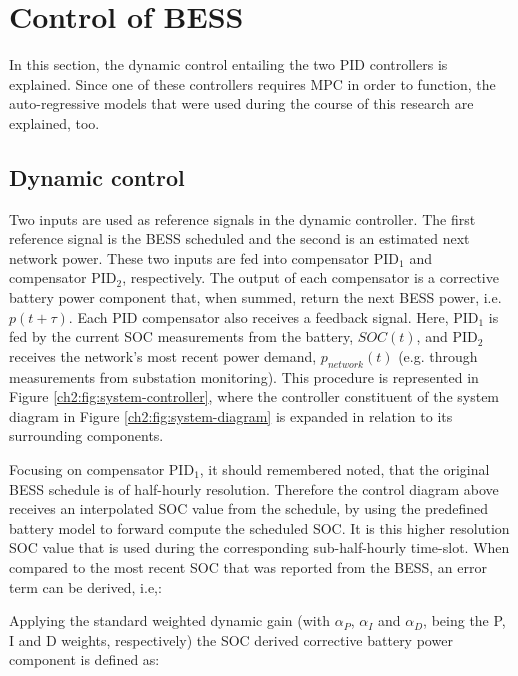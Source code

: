 \section{Control of BESS}
\label{ch2:sec:control-of-bess}

In this section, the dynamic control entailing the two PID controllers is explained.
Since one of these controllers requires MPC in order to function, the auto-regressive models that were used during the course of this research are explained, too.

\subsection{Dynamic control}

Two inputs are used as reference signals in the dynamic controller.
The first reference signal is the BESS scheduled and the second is an estimated next network power.
These two inputs are fed into compensator PID$_1$ and compensator PID$_2$, respectively.
The output of each compensator is a corrective battery power component that, when summed, return the next BESS power, i.e. $p(t+\tau)$.
Each PID compensator also receives a feedback signal.
Here, PID$_1$ is fed by the current SOC measurements from the battery, $SOC(t)$, and PID$_2$ receives the network's most recent power demand, $p_{network}(t)$ (e.g. through measurements from substation monitoring).
This procedure is represented in Figure \ref{ch2:fig:system-controller}, where the controller constituent of the system diagram in Figure \ref{ch2:fig:system-diagram} is expanded in relation to its surrounding components.



Focusing on compensator PID$_1$, it should remembered noted, that the original BESS schedule is of half-hourly resolution.
Therefore the control diagram above receives an interpolated SOC value from the schedule, by using the predefined battery model to forward compute the scheduled SOC.
It is this higher resolution SOC value that is used during the corresponding sub-half-hourly time-slot.
When compared to the most recent SOC that was reported from the BESS, an error term can be derived, i.e,:



Applying the standard weighted dynamic gain (with $\alpha_P$, $\alpha_I$ and $\alpha_D$, being the P, I and D weights, respectively) the SOC derived corrective battery power component is defined as:

